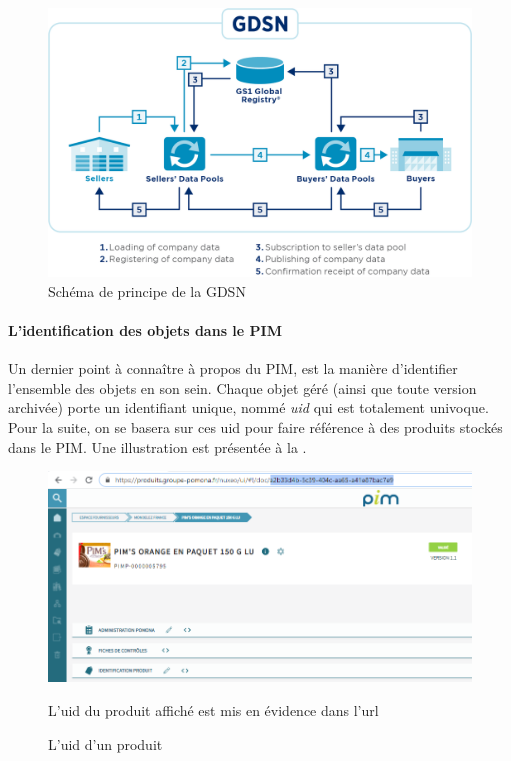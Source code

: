                 \begin{figure}[htpb]
                    \begin{center}
                    \includegraphics[width=\linewidth]{img/gdsn-schema.png}
                    \end{center}
                    \caption{Schéma de principe de la GDSN}
                    \label{fig:GDSN}
                \end{figure}                 
                
                \paragraph{L'identification des objets dans le PIM}
                \label{uid}

                Un dernier point à connaître à propos du PIM, est la manière d'identifier l'ensemble des objets en son sein.
                Chaque objet géré (ainsi que toute version archivée) porte un identifiant unique, nommé \emph{uid} qui est totalement univoque.
                Pour la suite, on se basera sur ces uid pour faire référence à des produits stockés dans le PIM.
                Une illustration est présentée à la .

                \begin{figure}[htpb]
                    \begin{center}
                    \includegraphics[width=\linewidth]{img/uid.png}
                    \end{center}
                    L'uid du produit affiché est mis en évidence dans l'url
                    \caption{L'uid d'un produit}
                    \label{fig:uid}
                \end{figure}                 

